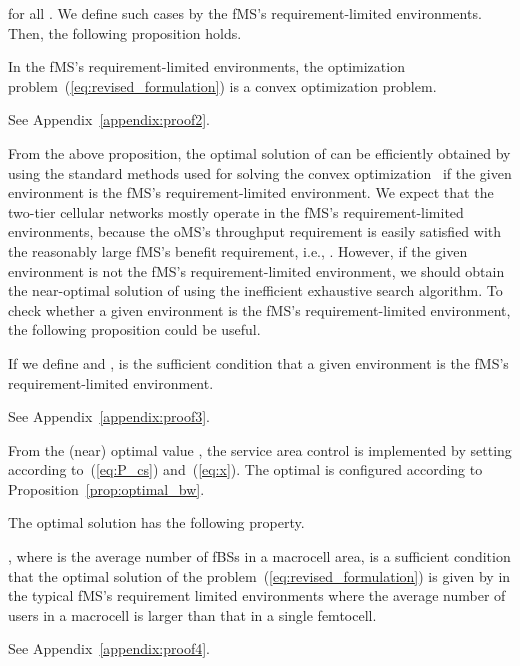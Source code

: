 \documentclass[journal]{IEEEtran}
\begin{document}
for all .
We define such cases by the fMS's requirement-limited environments.
Then, the following proposition holds.
\begin{prop} \label{prop:convex}
In the fMS's requirement-limited environments, the optimization
problem~(\ref{eq:revised_formulation}) is a convex optimization problem.
\end{prop}
\begin{IEEEproof} See Appendix~\ref{appendix:proof2}.
\end{IEEEproof}
From the above proposition, the optimal solution of  can be efficiently obtained by using the
standard methods used for solving the convex optimization~\cite{book04boyd} if
the given environment is the fMS's requirement-limited environment.
We expect that the two-tier cellular networks mostly  operate in the fMS's requirement-limited
environments, because the oMS's throughput requirement is easily satisfied with the
reasonably large fMS's benefit requirement, i.e., .
However, if the given environment is not the fMS's requirement-limited environment,
we should obtain the near-optimal solution of  using the inefficient exhaustive search algorithm.
To check whether a given environment is the fMS's requirement-limited environment,
the following proposition could be useful.
\begin{prop} \label{prop:convex_condition}
If we define   and
, 
is the sufficient condition that a given environment is the fMS's requirement-limited environment.
\end{prop}
\begin{IEEEproof}
See Appendix~\ref{appendix:proof3}.
\end{IEEEproof}

From the (near) optimal value , the service area control is implemented by
setting  according to~(\ref{eq:P_cs}) and~(\ref{eq:x}).
The optimal  is configured according to Proposition~\ref{prop:optimal_bw}.

The optimal solution  has the following property.
\begin{prop} \label{prop:D_max_optimal}
, where  is the average number of fBSs in a macrocell area, is a sufficient condition that the optimal solution of the problem~(\ref{eq:revised_formulation}) is given by
 in the typical fMS's requirement limited environments where
the average number of users in a macrocell is larger than that in a single femtocell.
\end{prop}
\begin{IEEEproof}
See Appendix~\ref{appendix:proof4}.
\end{IEEEproof}
\end{document}
